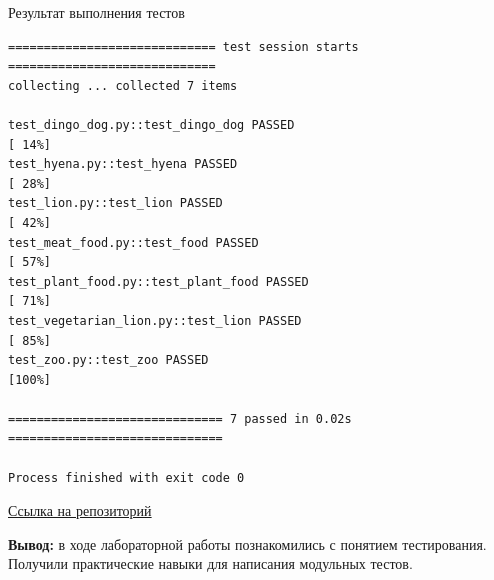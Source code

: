 \documentclass[a4paper,14pt]{extarticle}
\begin{document}
Результат выполнения тестов
\begin{verbatim}
============================= test session starts =============================
collecting ... collected 7 items

test_dingo_dog.py::test_dingo_dog PASSED                                 [ 14%]
test_hyena.py::test_hyena PASSED                                         [ 28%]
test_lion.py::test_lion PASSED                                           [ 42%]
test_meat_food.py::test_food PASSED                                      [ 57%]
test_plant_food.py::test_plant_food PASSED                               [ 71%]
test_vegetarian_lion.py::test_lion PASSED                                [ 85%]
test_zoo.py::test_zoo PASSED                                             [100%]

============================== 7 passed in 0.02s ==============================

Process finished with exit code 0
\end{verbatim}

\href{https://gitlab.com/vlad4052/2024_pv223_vladislav_10}{Ссылка на репозиторий}

\textbf{Вывод: } в ходе лабораторной работы познакомились с понятием тестирования. Получили
практические навыки для написания модульных тестов.
\end{document}
